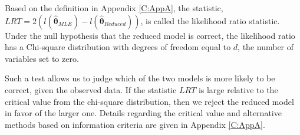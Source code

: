 \documentclass[]{book}
\theoremstyle{definition}
\theoremstyle{definition}
\theoremstyle{definition}
\theoremstyle{remark}
\begin{document}
Based on the definition in Appendix \ref{C:AppA}, the statistic,
\(LRT= 2 \left( l(\hat{\boldsymbol{\theta}}_{MLE}) - l(\hat{\boldsymbol{\theta}}_{Reduced}) \right)\),
is called the likelihood ratio statistic. Under the null hypothesis that
the reduced model is correct, the likelihood ratio has a Chi-square
distribution with degrees of freedom equal to \(d\), the number of
variables set to zero.

Such a test allows us to judge which of the two models is more likely to
be correct, given the observed data. If the statistic \(LRT\) is large
relative to the critical value from the chi-square distribution, then we
reject the reduced model in favor of the larger one. Details regarding
the critical value and alternative methods based on information criteria
are given in Appendix \ref{C:AppA}.


\end{document}
